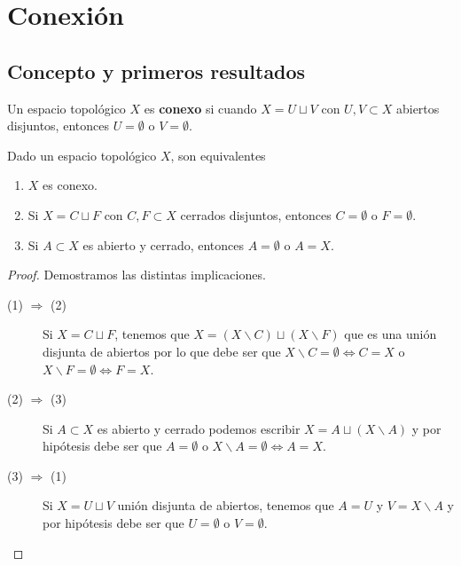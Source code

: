 \chapter{Conexión}
\section{Concepto y primeros resultados}
\begin{definition}
Un espacio topológico $\displaystyle X $ es \textbf{conexo} si cuando $\displaystyle X = U \sqcup V $ con $\displaystyle U,V\subset X $ abiertos disjuntos, entonces $\displaystyle U = \emptyset $ o $\displaystyle V = \emptyset $. 
\end{definition}
\begin{prop}
Dado un espacio topológico $\displaystyle X $, son equivalentes
\begin{enumerate}
\item $\displaystyle X $ es conexo.
\item Si $\displaystyle X = C \sqcup F $ con $\displaystyle C,F \subset X$ cerrados disjuntos, entonces $\displaystyle C = \emptyset $ o $\displaystyle F = \emptyset $.
\item Si $\displaystyle A\subset X $ es abierto y cerrado, entonces $\displaystyle A = \emptyset  $ o $\displaystyle A = X $.
\end{enumerate}
\end{prop}
\begin{proof}
Demostramos las distintas implicaciones.
\begin{description}
\item[(1) $\displaystyle \Rightarrow $ (2)] Si $\displaystyle X = C \sqcup F $, tenemos que $\displaystyle X = \left(X \backslash C\right)\sqcup \left(X \backslash F\right) $ que es una unión disjunta de abiertos por lo que debe ser que $\displaystyle X \backslash C = \emptyset \iff C = X $ o $\displaystyle X \backslash F = \emptyset \iff F = X $. 
\item[(2) $\displaystyle \Rightarrow $ (3)] Si $\displaystyle A \subset X$ es abierto y cerrado podemos escribir $\displaystyle X = A \sqcup \left(X \backslash A\right)$ y por hipótesis debe ser que $\displaystyle A = \emptyset  $ o $\displaystyle X \backslash A = \emptyset \iff A = X$. 
\item[(3) $\displaystyle \Rightarrow $ (1)] Si $\displaystyle X = U \sqcup V $ unión disjunta de abiertos, tenemos que $\displaystyle A = U $ y $\displaystyle V = X \backslash A $ y por hipótesis debe ser que $\displaystyle U = \emptyset $ o $\displaystyle V = \emptyset $. 
\end{description}
\end{proof}
